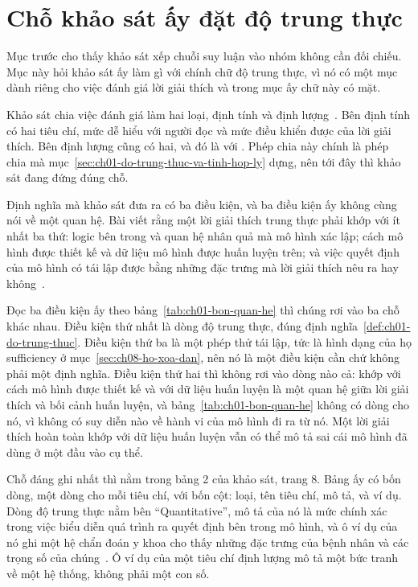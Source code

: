 \section{Chỗ khảo sát ấy đặt độ trung thực}
\label{sec:ch17-cho-dat-do-trung-thuc}

%
Mục trước cho thấy khảo sát xếp chuỗi suy luận vào nhóm không cần đối chiếu. Mục
này hỏi khảo sát ấy làm gì với chính chữ độ trung thực, vì nó có một mục dành
riêng cho việc đánh giá lời giải thích và trong mục ấy chữ này có mặt.

%
Khảo sát chia việc đánh giá làm hai loại, định tính và định
lượng~\autocite{p16llmxai}. Bên định tính có hai tiêu chí, mức dễ hiểu với người
đọc và mức điều khiển được của lời giải thích. Bên định lượng cũng có hai, và
đó là  với
. Phép chia này chính là phép chia mà
mục~\ref{sec:ch01-do-trung-thuc-va-tinh-hop-ly} dựng, nên tới đây thì khảo sát
đang đứng đúng chỗ.

%
Định nghĩa mà khảo sát đưa ra có ba điều kiện, và ba điều kiện ấy không cùng
nói về một quan hệ. Bài viết rằng một lời giải thích trung thực phải khớp với ít
nhất ba thứ: logic bên trong và quan hệ nhân quả mà mô hình xác lập; cách mô
hình được thiết kế và dữ liệu mô hình được huấn luyện trên; và việc quyết định
của mô hình có tái lập được bằng những đặc trưng mà lời giải thích nêu ra hay
không~\autocite{p16llmxai}.

Đọc ba điều kiện ấy theo bảng~\ref{tab:ch01-bon-quan-he} thì chúng rơi vào ba
chỗ khác nhau. Điều kiện thứ nhất là dòng độ trung thực, đúng
định nghĩa~\ref{def:ch01-do-trung-thuc}. Điều kiện thứ ba là một phép thử tái
lập, tức là hình dạng của họ sufficiency ở
mục~\ref{sec:ch08-ho-xoa-dan}, nên nó là một điều kiện cần chứ không phải một
định nghĩa. Điều kiện thứ hai thì không rơi vào dòng nào cả: khớp với cách mô
hình được thiết kế và với dữ liệu huấn luyện là một quan hệ giữa lời giải thích
và bối cảnh huấn luyện, và bảng~\ref{tab:ch01-bon-quan-he} không có dòng cho nó,
vì không có suy diễn nào về hành vi của mô hình đi ra từ nó. Một lời giải thích
hoàn toàn khớp với dữ liệu huấn luyện vẫn có thể mô tả sai cái mô hình đã dùng ở
một đầu vào cụ thể.

%
Chỗ đáng ghi nhất thì nằm trong bảng 2 của khảo sát, trang 8. Bảng ấy có bốn
dòng, một dòng cho mỗi tiêu chí, với bốn cột: loại, tên tiêu chí, mô tả, và ví
dụ. Dòng độ trung thực nằm bên \enquote{Quantitative}, mô tả của nó là mức chính
xác trong việc biểu diễn quá trình ra quyết định bên trong mô hình, và ô ví dụ
của nó ghi một hệ chẩn đoán y khoa cho thấy những đặc trưng của bệnh nhân và các
trọng số của chúng~\autocite{p16llmxai}. Ô ví dụ của một tiêu chí định lượng mô
tả một bức tranh về một hệ thống, không phải một con số.

